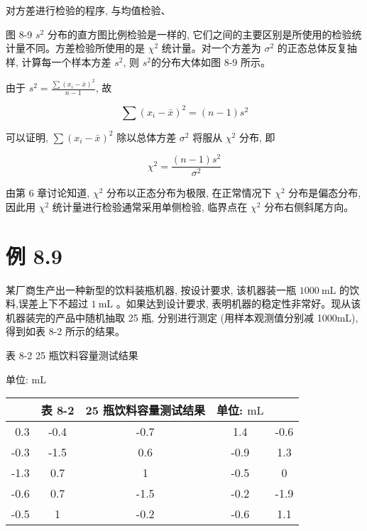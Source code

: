 \documentclass[10pt]{article}
\begin{document}
\begin{CJK*}{UTF8}{bsmi}
对方差进行检验的程序, 与均值检验、

\begin{center}
\end{center}

图 8-9 $s^{2}$ 分布的直方图比例检验是一样的, 它们之间的主要区别是所使用的检验统计量不同。方差检验所使用的是 $\chi^{2}$ 统计量。对一个方差为 $\sigma^{2}$ 的正态总体反复抽样, 计算每一个样本方差 $s^{2}$, 则 $s^{2}$的分布大体如图 8-9 所示。

由于 $s^{2}=\frac{\sum\left(x_{i}-\bar{x}\right)^{2}}{n-1}$, 故

$$
\sum\left(x_{i}-\bar{x}\right)^{2}=(n-1) s^{2}
$$

可以证明, $\sum\left(x_{i}-\bar{x}\right)^{2}$ 除以总体方差 $\sigma^{2}$ 将服从 $\chi^{2}$ 分布, 即


\begin{equation*}
\chi^{2}=\frac{(n-1) s^{2}}{\sigma^{2}} \tag{8.4}
\end{equation*}


由第 6 章讨论知道, $\chi^{2}$ 分布以正态分布为极限, 在正常情况下 $\chi^{2}$ 分布是偏态分布,因此用 $\chi^{2}$ 统计量进行检验通常采用单侧检验, 临界点在 $\chi^{2}$ 分布右侧斜尾方向。

\section*{例 8.9}
某厂商生产出一种新型的饮料装瓶机器, 按设计要求, 该机器装一瓶 $1000 \mathrm{~mL}$ 的饮料,误差上下不超过 $1 \mathrm{~mL}$ 。如果达到设计要求, 表明机器的稳定性非常好。现从该机器装完的产品中随机抽取 25 瓶, 分别进行测定 (用样本观测值分别减 1000mL), 得到如表 8-2 所示的结果。

表 8-2 25 瓶饮料容量测试结果

单位: $\mathrm{mL}$

\begin{center}
\begin{tabular}{rcccc}
 & 表 8-2 & $\mathbf{2 5}$ 瓶饮料容量测试结果 & 单位: $\mathrm{mL}$ &  \\
\hline
0.3 & -0.4 & -0.7 & 1.4 & -0.6 \\
-0.3 & -1.5 & 0.6 & -0.9 & 1.3 \\
-1.3 & 0.7 & 1 & -0.5 & 0 \\
-0.6 & 0.7 & -1.5 & -0.2 & -1.9 \\
-0.5 & 1 & -0.2 & -0.6 & 1.1 \\
\hline
\end{tabular}
\end{center}


\end{CJK*}
\end{document}
